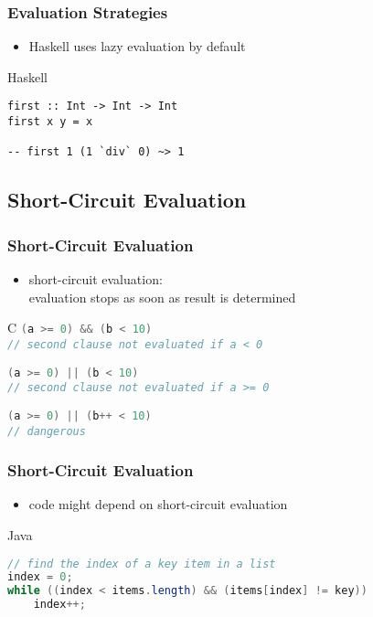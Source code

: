\documentclass[dvipsnames]{beamer}
\theoremstyle{plain}
\begin{document}
\begin{frame}[fragile]
  \frametitle{Evaluation Strategies}

  \begin{itemize}
    \item Haskell uses lazy evaluation by default
  \end{itemize}

  \begin{exampleblock}{Haskell}
    \begin{lstlisting}
first :: Int -> Int -> Int
first x y = x

-- first 1 (1 `div` 0) ~> 1
    \end{lstlisting}
  \end{exampleblock}
\end{frame}

\subsection{Short-Circuit Evaluation}

\begin{frame}
  \frametitle{Short-Circuit Evaluation}

  \begin{itemize}
    \item \alert{short-circuit evaluation}:\\
      evaluation stops as soon as result is determined
  \end{itemize}

  \pause
  \begin{exampleblock}{C}
    \lstinline[language=C]!(a >= 0) && (b < 10)!\\
    \lstinline[language=C]!// second clause not evaluated if a < 0!

    \bigskip
    \lstinline[language=C]!(a >= 0) || (b < 10)!\\
    \lstinline[language=C]|// second clause not evaluated if a >= 0|

    \pause
    \bigskip
    \lstinline[language=C]!(a >= 0) || (b++ < 10)!\\
    \lstinline[language=C]!// dangerous!
  \end{exampleblock}
\end{frame}

\begin{frame}[fragile]
  \frametitle{Short-Circuit Evaluation}

  \begin{itemize}
    \item code might depend on short-circuit evaluation
  \end{itemize}

  \begin{exampleblock}{Java}
    \begin{lstlisting}[language=Java]
// find the index of a key item in a list
index = 0;
while ((index < items.length) && (items[index] != key))
    index++;
    \end{lstlisting}
  \end{exampleblock}
\end{frame}
\end{document}
